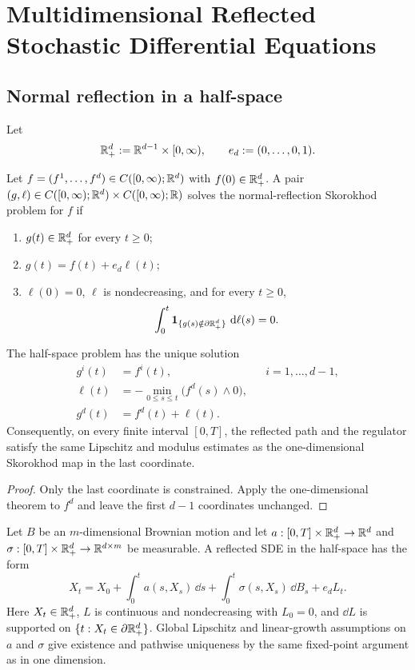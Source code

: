 \chapter[Multidimensional Reflected SDEs]{Multidimensional Reflected Stochastic Differential Equations}

\section{Normal reflection in a half-space}

Let
\[
  \mathbb R_+^d:=\mathbb R^{d-1}\times[0,\infty),
  \qquad
  e_d:=(0,\ldots,0,1).
\]

\begin{definition}
Let $f=(f^1,\ldots,f^d)\in C([0,\infty);\mathbb R^d)$ with
$f(0)\in\mathbb R_+^d$. A pair
$(g,\ell)\in C([0,\infty);\mathbb R^d)\times C([0,\infty);\mathbb R)$ solves the
normal-reflection Skorokhod problem for $f$ if
\begin{enumerate}[label=(\roman*)]
  \item $g(t)\in\mathbb R_+^d$ for every $t\geq0$;
  \item $g(t)=f(t)+e_d\ell(t)$;
  \item $\ell(0)=0$, $\ell$ is nondecreasing, and for every $t\geq0$,
  \[
    \int_0^t\mathbf 1_{\{g(s)\notin\partial\mathbb R_+^d\}}\,\mathop{}\!\mathrm d\ell(s)=0.
  \]
\end{enumerate}
\end{definition}

\begin{proposition}
The half-space problem has the unique solution
\begin{align*}
  g^i(t)&=f^i(t), &&i=1,\ldots,d-1,\\
  \ell(t)&=-\min_{0\leq s\leq t}\bigl(f^d(s)\wedge0\bigr),\\
  g^d(t)&=f^d(t)+\ell(t).
\end{align*}
Consequently, on every finite interval $[0,T]$, the reflected path and the
regulator satisfy the same Lipschitz and modulus estimates as the
one-dimensional Skorokhod map in the last coordinate.
\end{proposition}

\begin{proof}
Only the last coordinate is constrained. Apply the one-dimensional theorem
to $f^d$ and leave the first $d-1$ coordinates unchanged.
\end{proof}

Let $B$ be an $m$-dimensional Brownian motion and let
$a:[0,T]\times\mathbb R_+^d\to\mathbb R^d$ and
$\sigma:[0,T]\times\mathbb R_+^d\to\mathbb R^{d\times m}$ be measurable. A reflected SDE
in the half-space has the form
\begin{equation}
  X_t=X_0+\int_0^t a(s,X_s)\,\dd s
      +\int_0^t\sigma(s,X_s)\,\dd B_s+e_dL_t. \label{eq:halfspace-rsde}
\end{equation}
Here $X_t\in\mathbb R_+^d$, $L$ is continuous and nondecreasing with $L_0=0$, and
$\dd L$ is supported on $\{t:X_t\in\partial\mathbb R_+^d\}$. Global Lipschitz and
linear-growth assumptions on $a$ and $\sigma$ give existence and pathwise
uniqueness by the same fixed-point argument as in one dimension.

